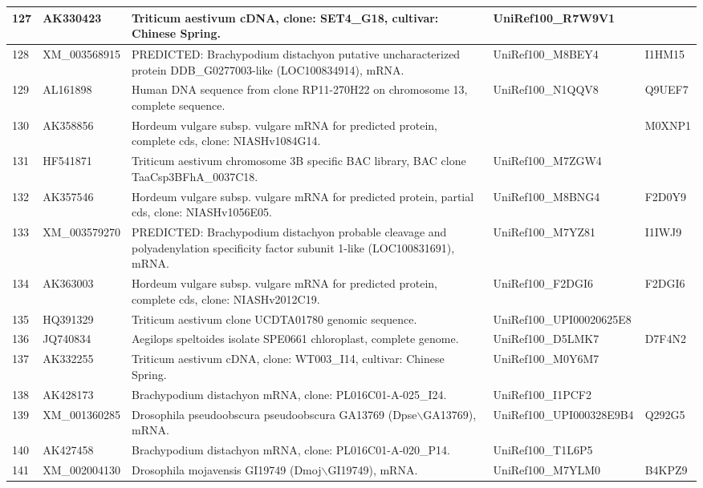 \documentclass[10.9pt]{article} %
\begin{document}
{\begin{longtable}{|p{1.3cm}|p{1.8cm}|p{6.2cm}|p{3.8cm}|p{2cm}|}
\hline
127 & AK330423 & Triticum aestivum cDNA, clone: SET4\_G18, cultivar: Chinese Spring. & UniRef100\_R7W9V1 & \\
\hline
128 & XM\_003568915 & PREDICTED: Brachypodium distachyon putative uncharacterized protein DDB\_G0277003-like (LOC100834914), mRNA. & UniRef100\_M8BEY4 & I1HM15\\
\hline
129 & AL161898 & Human DNA sequence from clone RP11-270H22 on chromosome 13, complete sequence. & UniRef100\_N1QQV8 & Q9UEF7\\
\hline
130 & AK358856 & Hordeum vulgare subsp. vulgare mRNA for predicted protein, complete cds, clone: NIASHv1084G14. &  & M0XNP1\\
\hline
131 & HF541871 & Triticum aestivum chromosome 3B specific BAC library, BAC clone TaaCsp3BFhA\_0037C18. & UniRef100\_M7ZGW4 & \\
\hline
132 & AK357546 & Hordeum vulgare subsp. vulgare mRNA for predicted protein, partial cds, clone: NIASHv1056E05. & UniRef100\_M8BNG4 & F2D0Y9\\
\hline
133 & XM\_003579270 & PREDICTED: Brachypodium distachyon probable cleavage and polyadenylation specificity factor subunit 1-like (LOC100831691), mRNA. & UniRef100\_M7YZ81 & I1IWJ9\\
\hline
134 & AK363003 & Hordeum vulgare subsp. vulgare mRNA for predicted protein, complete cds, clone: NIASHv2012C19. & UniRef100\_F2DGI6 & F2DGI6\\
\hline
135 & HQ391329 & Triticum aestivum clone UCDTA01780 genomic sequence. & UniRef100\_UPI00020625E8 & \\
\hline
136 & JQ740834 & Aegilops speltoides isolate SPE0661 chloroplast, complete genome. & UniRef100\_D5LMK7 & D7F4N2\\
\hline
137 & AK332255 & Triticum aestivum cDNA, clone: WT003\_I14, cultivar: Chinese Spring. & UniRef100\_M0Y6M7 & \\
\hline
138 & AK428173 & Brachypodium distachyon mRNA, clone: PL016C01-A-025\_I24. & UniRef100\_I1PCF2 & \\
\hline
139 & XM\_001360285 & Drosophila pseudoobscura pseudoobscura GA13769 (Dpse$\backslash$GA13769), mRNA. & UniRef100\_UPI000328E9B4 & Q292G5\\
\hline
140 & AK427458 & Brachypodium distachyon mRNA, clone: PL016C01-A-020\_P14. & UniRef100\_T1L6P5 & \\
\hline
141 & XM\_002004130 & Drosophila mojavensis GI19749 (Dmoj$\backslash$GI19749), mRNA. & UniRef100\_M7YLM0 & B4KPZ9\\

\end{longtable}}
\end{document}
